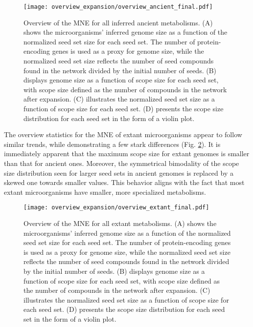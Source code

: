 \begin{figure}[H]
    \centering
    \texttt{[image: overview\_expansion/overview\_ancient\_final.pdf]}
    \caption{Overview of the MNE for all inferred ancient metabolisms. (A) shows the microorganisms' inferred genome size as a function of the normalized seed set size for each seed set. The number of protein-encoding genes is used as a proxy for genome size, while the normalized seed set size reflects the number of seed compounds found in the network divided by the initial number of seeds. (B) displays genome size as a function of scope size for each seed set, with scope size defined as the number of compounds in the network after expansion. (C) illustrates the normalized seed set size as a function of scope size for each seed set. (D) presents the scope size distribution for each seed set in the form of a violin plot.}
    \label{overview_ancient}
\end{figure} 

The overview statistics for the MNE of extant microorganisms appear to follow similar trends, while demonstrating a few stark differences (Fig. \ref{overview_extant}). It is immediately apparent that the maximum scope size for extant genomes is smaller than that for ancient ones. Moreover, the symmetrical bimodality of the scope size distribution seen for larger seed sets in ancient genomes is replaced by a skewed one towards smaller values. This behavior aligns with the fact that most extant microorganisms have smaller, more specialized metabolisms.

\begin{figure}[H]
    \centering
    \texttt{[image: overview\_expansion/overview\_extant\_final.pdf]}
    \caption{Overview of the MNE for all extant metabolisms. (A) shows the microorganisms' inferred genome size as a function of the normalized seed set size for each seed set. The number of protein-encoding genes is used as a proxy for genome size, while the normalized seed set size reflects the number of seed compounds found in the network divided by the initial number of seeds. (B) displays genome size as a function of scope size for each seed set, with scope size defined as the number of compounds in the network after expansion. (C) illustrates the normalized seed set size as a function of scope size for each seed set. (D) presents the scope size distribution for each seed set in the form of a violin plot.}
    \label{overview_extant}
\end{figure}   

